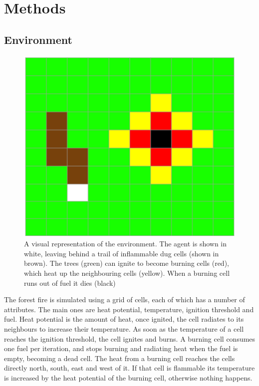 
\section{Methods}\label{sec:methods}

\subsection{Environment}\label{sec:environment}
\begin{figure}[h]
    \centering
    \includegraphics[width=\linewidth]{img/Simulation.png}
    \caption{A visual representation of the environment. The agent is shown in white, leaving behind a trail of inflammable dug cells (shown in brown). The trees (green) can ignite to become burning cells (red), which heat up the neighbouring cells (yellow). When a burning cell runs out of fuel it dies (black)}
    \label{fig:simulation}
\end{figure}
The forest fire is simulated using a grid of cells, each of which has a number of attributes. The main ones are heat potential, temperature, ignition threshold and fuel. Heat potential is the amount of heat, once ignited, the cell radiates to its neighbours to increase their temperature. As soon as the temperature of a cell reaches the ignition threshold, the cell ignites and burns. A burning cell consumes one fuel per iteration, and stops burning and radiating heat when the fuel is empty, becoming a dead cell. The heat from a burning cell reaches the cells directly north, south, east and west of it. If that cell is flammable its temperature is increased by the heat potential of the burning cell, otherwise nothing happens.

